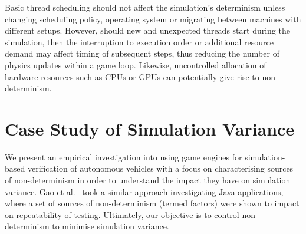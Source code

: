 \documentclass[letterpaper, 10 pt, journal, twoside]{IEEEtran}
\begin{document}
%
Basic thread scheduling should not affect the simulation's determinism unless changing scheduling policy, operating system or migrating between machines with different setups. 
%
However, should new and unexpected threads start during the simulation, then the interruption to execution order or additional resource demand may affect timing of subsequent steps, thus reducing the number of physics updates within a game loop. Likewise, uncontrolled allocation of hardware resources such as CPUs or GPUs can potentially give rise to non-determinism. 
%

%
%




\section{Case Study of Simulation Variance} \label{s:case-study}

We present an empirical investigation into using game engines for
simulation-based verification of autonomous vehicles with a focus on
characterising sources of non-determinism in order to understand  the impact
they have on simulation variance. 
%
%
Gao et al.~\cite{when-and-what-should-we-control} took a similar approach investigating Java applications, where a set of sources of non-determinism (termed factors) were shown to impact on repeatability of testing. %
%
Ultimately, our objective is to control non-determinism to minimise simulation variance.
\end{document}
